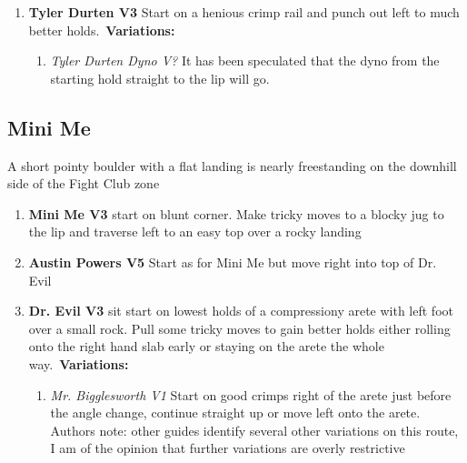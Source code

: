 \begin{enumerate}[resume]
	\item\label{rt:Tyler Durten} \colorbox{green!20}{\textbf{Tyler Durten V3   } }
	\newline Start on a henious crimp rail and punch out left to much better holds.\
	\newline \textbf{Variations:}
	\begin{enumerate}
		\item\label{vr:Tyler Durten Dyno} \colorbox{black!20}{\emph{Tyler Durten Dyno V?  }  }
		\newline It has been speculated that the dyno from the starting hold straight to the lip will go.\
	\end{enumerate}
\end{enumerate}
\subsection*{Mini Me}\label{bf:Mini Me}
A short pointy boulder with a flat landing is nearly freestanding on the downhill side of the Fight Club zone

\begin{enumerate}[resume]
	\item\label{rt:Mini Me} \colorbox{green!20}{\textbf{Mini Me V3  } }
	\newline start on blunt corner. Make tricky moves to a blocky jug to the lip and traverse left to an easy top over a rocky landing\
	\item\label{rt:Austin Powers} \colorbox{RoyalBlue!20}{\textbf{Austin Powers V5   } }
	\newline Start as for Mini Me but move right into top of Dr. Evil\
	\item\label{rt:Dr. Evil} \colorbox{green!20}{\textbf{Dr. Evil V3   } }
	\newline sit start on lowest holds of a compressiony arete with left foot over a small rock. Pull some tricky moves to gain better holds either rolling onto the right hand slab early or staying on the arete the whole way.\
	\newline \textbf{Variations:}
	\begin{enumerate}
		\item\label{vr:Mr. Bigglesworth} \colorbox{green!20}{\emph{Mr. Bigglesworth V1   }  }
		\newline Start on good crimps right of the arete just before the angle change, continue straight up or move left onto the arete. Authors note: other guides identify several other variations on this route, I am of the opinion that further variations are overly restrictive\
	\end{enumerate}
\end{enumerate}
